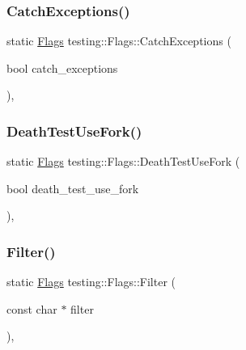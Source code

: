\mbox{\label{structtesting_1_1_flags_a2c7d89f62f4328ae0ced66154ef96b44}} 
\subsubsection{\texorpdfstring{Catch\+Exceptions()}{CatchExceptions()}}
{\footnotesize\ttfamily static \hyperlink{structtesting_1_1_flags}{Flags} testing\+::\+Flags\+::\+Catch\+Exceptions (\begin{DoxyParamCaption}\item[{bool}]{catch\+\_\+exceptions }\end{DoxyParamCaption})\hspace{0.3cm}{\ttfamily [inline]}, {\ttfamily [static]}}

\mbox{\label{structtesting_1_1_flags_a4468e5625833043596c44be174349d8c}} 
\subsubsection{\texorpdfstring{Death\+Test\+Use\+Fork()}{DeathTestUseFork()}}
{\footnotesize\ttfamily static \hyperlink{structtesting_1_1_flags}{Flags} testing\+::\+Flags\+::\+Death\+Test\+Use\+Fork (\begin{DoxyParamCaption}\item[{bool}]{death\+\_\+test\+\_\+use\+\_\+fork }\end{DoxyParamCaption})\hspace{0.3cm}{\ttfamily [inline]}, {\ttfamily [static]}}

\mbox{\label{structtesting_1_1_flags_afc7350b7c1ac4c0e0efe2d9a94729eb7}} 
\subsubsection{\texorpdfstring{Filter()}{Filter()}}
{\footnotesize\ttfamily static \hyperlink{structtesting_1_1_flags}{Flags} testing\+::\+Flags\+::\+Filter (\begin{DoxyParamCaption}\item[{const char $\ast$}]{filter }\end{DoxyParamCaption})\hspace{0.3cm}{\ttfamily [inline]}, {\ttfamily [static]}}

